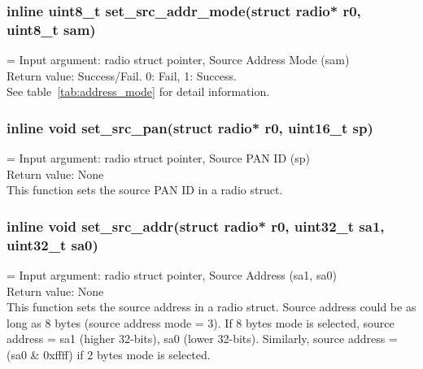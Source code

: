 \subsubsection{inline uint8\_t set\_src\_addr\_mode(struct radio* r0, uint8\_t sam)}
\hangindent=\parindent
{}
Input argument: radio struct pointer, Source Address Mode (sam)\\
Return value: Success/Fail. 0: Fail, 1: Success.\\
See table~\ref{tab:address_mode} for detail information.

\subsubsection{inline void set\_src\_pan(struct radio* r0, uint16\_t sp)}
\hangindent=\parindent
{}
Input argument: radio struct pointer, Source PAN ID (sp)\\
Return value: None\\
This function sets the source PAN ID in a radio struct.

\subsubsection{inline void set\_src\_addr(struct radio* r0, uint32\_t sa1, uint32\_t sa0)}
\hangindent=\parindent
{}
Input argument: radio struct pointer, Source Address (sa1, sa0)\\
Return value: None\\
This function sets the source address in a radio struct. Source address could be as
long as 8 bytes (source address mode = 3). If 8 bytes mode is selected, source  
address = {sa1 (higher 32-bits), sa0 (lower 32-bits)}. Similarly, source address = 
(sa0 \& 0xffff) if 2 bytes mode is selected.

